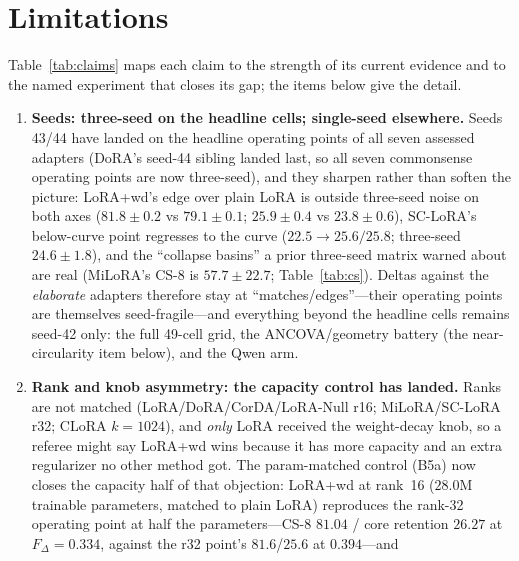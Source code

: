 \documentclass[11pt]{article}
\newcommand{\dw}{F_{\Delta}}
\begin{document}
\section*{Limitations}
Table~\ref{tab:claims} maps each claim to the strength of its current evidence and
to the named experiment that closes its gap; the items below give the detail.



\begin{enumerate}
  \item \textbf{Seeds: three-seed on the headline cells; single-seed elsewhere.}
        Seeds 43/44 have landed on the headline operating points of all seven
        assessed adapters (DoRA's seed-44 sibling landed last, so all seven
        commonsense operating points are now three-seed), and they sharpen
        rather than soften the picture: LoRA{+}wd's edge
        over plain LoRA is outside three-seed noise on both axes
        ($81.8\!\pm\!0.2$ vs $79.1\!\pm\!0.1$; $25.9\!\pm\!0.4$ vs
        $23.8\!\pm\!0.6$), SC-LoRA's below-curve point regresses to the curve
        ($22.5\!\to\!25.6/25.8$; three-seed $24.6\!\pm\!1.8$), and the
        ``collapse basins'' a prior three-seed matrix warned about are real
        (MiLoRA's CS-8 is $57.7\!\pm\!22.7$; Table~\ref{tab:cs}). Deltas against
        the \emph{elaborate} adapters therefore stay at ``matches/edges''---their
        operating points are themselves seed-fragile---and everything beyond the
        headline cells remains seed-42 only: the full 49-cell grid, the
        ANCOVA/geometry battery (the near-circularity item below), and the Qwen
        arm.
  \item \textbf{Rank and knob asymmetry: the capacity control has landed.}
        Ranks are not matched
        (LoRA/DoRA/CorDA/LoRA-Null r16; MiLoRA/SC-LoRA r32; CLoRA $k{=}1024$), and
        \emph{only} LoRA received the weight-decay knob, so a referee might say
        LoRA{+}wd wins because it has more capacity and an extra regularizer no
        other method got. The param-matched control (B5a) now closes the
        capacity half of that objection: LoRA{+}wd at rank~16 ($28.0$M trainable
        parameters, matched to plain LoRA) reproduces the rank-32 operating
        point at half the parameters---CS-8 $81.04$ / core retention $26.27$ at
        $\dw\!=\!0.334$, against the r32 point's $81.6$/$25.6$ at $0.394$---and

\end{enumerate}
\end{document}
